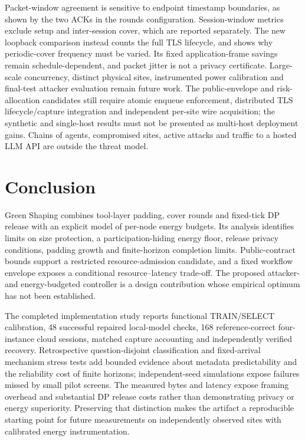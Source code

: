 Packet-window agreement is sensitive to endpoint timestamp boundaries, as shown by the two ACKs in the rounds configuration. Session-window metrics exclude setup and inter-session cover, which are reported separately. The new loopback comparison instead counts the full TLS lifecycle, and shows why periodic-cover frequency must be varied. Its fixed application-frame savings remain schedule-dependent, and packet jitter is not a privacy certificate. Large-scale concurrency, distinct physical sites, instrumented power calibration and final-test attacker evaluation remain future work. The public-envelope and risk-allocation candidates still require atomic enqueue enforcement, distributed TLS lifecycle/capture integration and independent per-site wire acquisition; the synthetic and single-host results must not be presented as multi-host deployment gains. Chains of agents, compromised sites, active attacks and traffic to a hosted LLM API are outside the threat model.

\section{Conclusion}\label{sec:conclusion}
Green Shaping combines tool-layer padding, cover rounds and fixed-tick DP release with an explicit model of per-node energy budgets. Its analysis identifies limits on size protection, a participation-hiding energy floor, release privacy conditions, padding growth and finite-horizon completion limits. Public-contract bounds support a restricted resource-admission candidate, and a fixed workflow envelope exposes a conditional resource--latency trade-off. The proposed attacker- and energy-budgeted controller is a design contribution whose empirical optimum has not been established.

The completed implementation study reports functional TRAIN/SELECT calibration, 48 successful repaired local-model checks, 168 reference-correct four-instance cloud sessions, matched capture accounting and independently verified recovery. Retrospective question-disjoint classification and fixed-arrival mechanism stress tests add bounded evidence about metadata predictability and the reliability cost of finite horizons; independent-seed simulations expose failures missed by small pilot screens. The measured bytes and latency expose framing overhead and substantial DP release costs rather than demonstrating privacy or energy superiority. Preserving that distinction makes the artifact a reproducible starting point for future measurements on independently observed sites with calibrated energy instrumentation.
